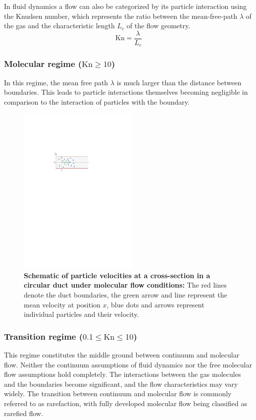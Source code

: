 	In fluid dynamics a flow can also be categorized by its particle interaction using the Knudsen number, which represents the ratio between the mean-free-path $\lambda$ of the gas and the characteristic length $L_c$ of the flow geometry.
	\begin{equation}
		\mathrm{Kn} = \frac{\lambda}{L_c}
		\label{eq:knudsen-number}
	\end{equation}

\subsubsection*{Molecular regime ($\mathrm{Kn} \geq 10$)}
	In this regime, the mean free path $\lambda$ is much larger than the distance between boundaries.
	This leads to particle interactions themselves becoming negligible in comparison to the interaction of particles with the boundary.
	\begin{figure}[H]
	    \centering
	    \includegraphics[width=0.52\textwidth]{src/02_foundations/fig_molecular-regime.pdf}
		\caption[Schematic of particle velocities at a cross-section in a circular duct under molecular flow conditions.]{
			\textbf{Schematic of particle velocities at a cross-section in a circular duct under molecular flow conditions:}
			The red lines denote the duct boundaries, the green arrow and line represent the mean velocity at position $x$, blue dots and arrows represent individual particles and their velocity.
		}
		\label{fig:molecular-flow}
	\end{figure}

\subsubsection*{Transition regime ($0.1 \leq \mathrm{Kn} \leq 10$)}
	This regime constitutes the middle ground between continuum and molecular flow.
	Neither the continuum assumptions of fluid dynamics nor the free molecular flow assumptions hold completely.
	The interactions between the gas molecules and the boundaries become significant, and the flow characteristics may vary widely.
	The transition between continuum and molecular flow is commonly referred to as rarefaction, with fully developed molecular flow being classified as rarefied flow. 

